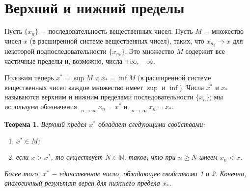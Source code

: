 \documentclass{article}
\newtheorem{theorem}{Теорема}[section]
\DeclareMathOperator*\lowlim{\underline{lim}}
\DeclareMathOperator*\uplim{\overline{lim}}
\begin{document}
\section{Верхний и нижний пределы}

Пусть \(\{x_n\}\) \(-\) последовательность вещественных чисел. Пусть \(M\) \(-\) множество чисел \(x\) (в расширенной системе вещественных чисел), таких, что \(x_{n_k} \to x\) для некоторой подпоследовательности \(\{x_{n_k}\}\). Это множество \(M\) содержит все частичные пределы и, возможно, числа \(+ \infty\), \(- \infty\).

Положим теперь \(x^{*} = \sup M\) и \(x_{*} = \inf M\) (в расширенной системе вещественных чисел каждое множество имеет \(\sup\) и \(\inf\)). Числа \(x^{*}\) и \(x_{*}\) называются верхним и нижним пределами последовательности \(\{x_n\}\); мы используем обозначения \(\uplim\limits_{n \to \infty}{x_n} = x^{*}\) и \(\lowlim\limits_{n \to \infty}{x_n} = x_{*}\).

\begin{theorem}
Верхний предел \(x^{*}\) обладает следующими свойствами:
\begin{enumerate}
  \item \(x^{*} \in M\);
  \item если \(x > x^{*}\), то существует \(N \in \mathbb{N}\), такое, что при \(n \geq N\) имеем \(x_n < x\).
\end{enumerate}
Более того, \(x^{*}\) \(-\) единственное число, обладающее свойствами \textit{1} и \textit{2}. Конечно, аналогичный результат верен для нижнего предела \(x_{*}\).
\end{theorem}
\end{document}
